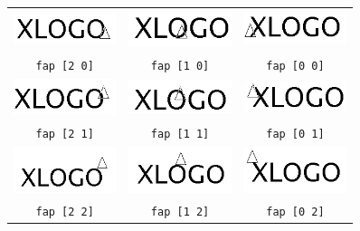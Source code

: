 \begin{center}
 \begin{tabular}{|c|c|c|}
 \hline
\includegraphics[width=3cm]{images/fap20.png} & \includegraphics[width=3cm]{images/fap10.png} & \includegraphics[width=3cm]{images/fap00.png} \\
\texttt{fap [2 0]} & \texttt{fap [1 0]} & \texttt{fap [0 0]}\\
 \hline
\includegraphics[width=3cm]{images/fap21.png}& \includegraphics[width=3cm]{images/fap11.png} & \includegraphics[width=3cm]{images/fap01.png} \\
\texttt{fap [2 1]} & \texttt{fap [1 1]} & \texttt{fap [0 1]}\\
 \hline
\includegraphics[width=3cm]{images/fap22.png}& \includegraphics[width=3cm]{images/fap12.png} & \includegraphics[width=3cm]{images/fap02.png} \\
\texttt{fap [2 2]} & \texttt{fap [1 2]} & \texttt{fap [0 2]}\\
 \hline
\end{tabular}
\end{center}
